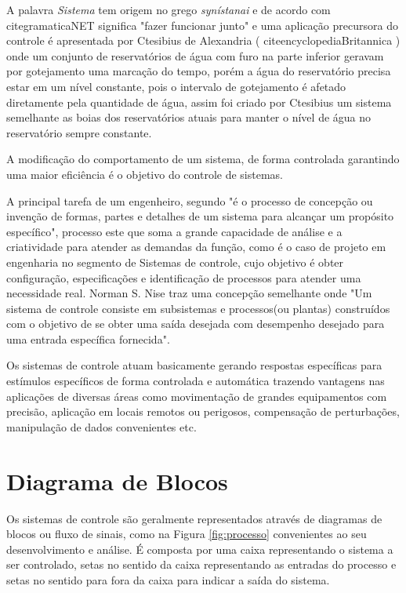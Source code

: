 
A palavra \emph{Sistema} tem origem no grego \emph{synístanai} e de acordo com cite{gramaticaNET} significa "fazer funcionar junto" e uma aplicação precursora do controle é apresentada por Ctesibius de Alexandria ( cite{encyclopediaBritannica} ) onde um conjunto de reservatórios de água com furo na parte inferior geravam por gotejamento uma marcação do tempo, porém a água do reservatório precisa estar em um nível constante, pois o intervalo de gotejamento é afetado diretamente pela quantidade de água, assim foi criado por Ctesibius um sistema semelhante as boias dos reservatórios atuais para manter o nível de água no reservatório sempre constante.

A modificação do comportamento de um sistema, de forma controlada garantindo uma maior eficiência é o objetivo do controle de sistemas. 

A principal tarefa de um engenheiro, segundo \cite{dorf2011modern} "é o processo de concepção ou invenção de formas, partes e detalhes de um sistema para alcançar um propósito específico", processo este que soma a grande capacidade de análise e a criatividade para atender as demandas da função, como é o caso de projeto em engenharia no segmento de Sistemas de controle, cujo objetivo é obter configuração, especificações e identificação de processos para atender uma necessidade real. Norman S. Nise traz uma concepção semelhante onde "Um sistema de controle consiste em subsistemas e processos(ou plantas) construídos com o objetivo de se obter uma saída desejada com desempenho desejado para uma entrada específica fornecida".

Os sistemas de controle atuam basicamente gerando respostas específicas para estímulos específicos de forma controlada e automática trazendo vantagens nas aplicações de diversas áreas como movimentação de grandes equipamentos com precisão, aplicação em locais remotos ou perigosos, compensação de perturbações, manipulação de dados convenientes etc.



\section{Diagrama de Blocos}

Os sistemas de controle são geralmente representados através de diagramas de blocos ou fluxo de sinais, como na Figura \ref{fig:processo} convenientes ao seu desenvolvimento e análise. É composta por uma caixa representando o sistema a ser controlado, setas no sentido da caixa representando as entradas do processo e setas no sentido para fora da caixa para indicar a saída do sistema.

